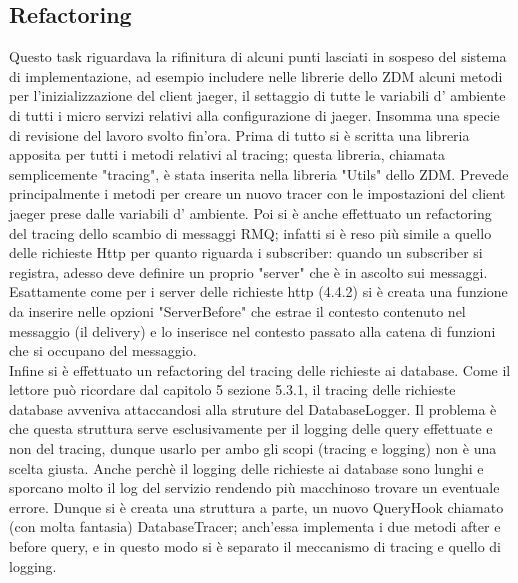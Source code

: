 \documentclass[a4paper,12pt,titlepage,italian,openany]{report}
\begin{document}
\subsection{Refactoring}
Questo task riguardava la rifinitura di alcuni punti lasciati in sospeso del sistema di implementazione, ad esempio includere nelle librerie dello ZDM\cite{zdm:1} alcuni metodi per l'inizializzazione del client jaeger, il settaggio di tutte le variabili d' ambiente di tutti i micro servizi relativi alla configurazione di jaeger\cite{jaeger:1}.
Insomma una specie di revisione del lavoro svolto fin'ora.
Prima di tutto si è scritta una libreria apposita per tutti i metodi relativi al tracing; questa libreria, chiamata semplicemente "tracing", 
è stata inserita nella libreria "Utils" dello ZDM\cite{zdm:1}.
Prevede principalmente i metodi per creare un nuovo tracer con le impostazioni del client jaeger prese dalle variabili d' ambiente.
Poi si è anche effettuato un refactoring del tracing dello scambio di messaggi RMQ\cite{rabbit:1}; infatti si è reso più simile a quello delle
 richieste Http per quanto riguarda i subscriber: quando un subscriber si registra, adesso deve definire un proprio "server" che è in ascolto sui messaggi.\\
Esattamente come per i server delle richieste http (4.4.2) si
è creata una funzione da inserire nelle opzioni "ServerBefore" che estrae il contesto contenuto nel messaggio (il delivery)
 e lo inserisce nel contesto passato alla catena di funzioni che si occupano del messaggio.
 \\Infine si è effettuato un refactoring del tracing delle richieste ai database. Come il lettore può ricordare dal capitolo 5 sezione 5.3.1, il tracing delle richieste database avveniva attaccandosi alla struture del DatabaseLogger. Il problema è che 
 questa struttura serve esclusivamente per il logging delle query effettuate e non del tracing, dunque usarlo per ambo gli scopi (tracing e logging) non è una scelta giusta. Anche perchè il logging delle richieste ai database sono lunghi e sporcano molto il log del servizio rendendo più macchinoso trovare un eventuale errore.
 Dunque si è creata una struttura a parte, un nuovo QueryHook chiamato (con molta fantasia) DatabaseTracer; anch'essa implementa i due metodi after e before query, e in questo modo si è separato il meccanismo di tracing e quello di logging.
 
\end{document}
